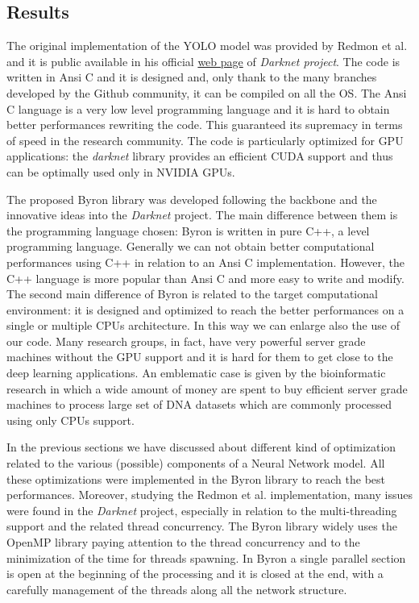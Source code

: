 \documentclass{standalone}
\begin{document}
\subsection[Results]{Results}\label{obj_detection:results}

The original implementation of the YOLO model was provided by Redmon et al. and it is public available in his official \href{https://pjreddie.com/darknet/yolo}{web page} of \emph{Darknet project}.
The code is written in Ansi C and it is designed and, only thank to the many branches developed by the Github community, it can be compiled on all the OS.
The Ansi C language is a very low level programming language and it is hard to obtain better performances rewriting the code.
This guaranteed its supremacy in terms of speed in the research community.
The code is particularly optimized for GPU applications: the \emph{darknet} library provides an efficient CUDA support and thus can be optimally used only in NVIDIA GPUs.

The proposed \textsf{Byron} library was developed following the backbone and the innovative ideas into the \emph{Darknet} project.
The main difference between them is the programming language chosen: \textsf{Byron} is written in pure C++, a  level programming language.
Generally we can not obtain better computational performances using C++ in relation to an Ansi C implementation.
However, the C++ language is more popular than Ansi C and more easy to write and modify.
The second main difference of \textsf{Byron} is related to the target computational environment: it is designed and optimized to reach the better performances on a single or multiple CPUs architecture.
In this way we can enlarge also the use of our code.
Many research groups, in fact, have very powerful server grade machines without the GPU support and it is hard for them to get close to the deep learning applications.
An emblematic case is given by the bioinformatic research in which a wide amount of money are spent to buy efficient server grade machines to process large set of DNA datasets which are commonly processed using only CPUs support.

In the previous sections we have discussed about different kind of optimization related to the various (possible) components of a Neural Network model.
All these optimizations were implemented in the \textsf{Byron} library to reach the best performances.
Moreover, studying the Redmon et al. implementation, many issues were found in the \emph{Darknet} project, especially in relation to the multi-threading support and the related thread concurrency.
The \textsf{Byron} library widely uses the OpenMP library paying attention to the thread concurrency and to the minimization of the time for threads spawning.
In \textsf{Byron} a single parallel section is open at the beginning of the processing and it is closed at the end, with a carefully management of the threads along all the network structure.
\end{document}
